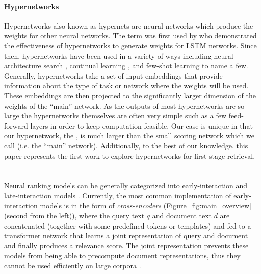 \documentclass[sigconf,]{acmart}
\begin{document}
\paragraph{\textbf{Hypernetworks}}
Hypernetworks also known as hypernets are neural networks which produce the weights for other neural networks. The term was first used by \citet{HyperNetworks} who demonstrated the effectiveness of hypernetworks to generate weights for LSTM networks. Since then, hypernetworks have been used in a variety of ways including neural architecture search \cite{GraphHyperNetworksNeuralArchitectureSearch}, continual learning \cite{ContinualLearningWithHypernetworks}, and few-shot learning \cite{MetaLearningWithLatentEmbeddingOptimization, HyperShot} to name a few. Generally, hypernetworks take a set of input embeddings that provide information about the type of task or network where the weights will be used. These embeddings are then projected to the significantly larger dimension of the weights of the ``main'' network. As the outputs of most hypernetworks are so large the hypernetworks themselves are often very simple such as a few feed-forward layers in order to keep computation feasible. Our case is unique in that our hypernetwork, the \name{}, is much larger than the small scoring network which we call \mininame{} (i.e. the ``main'' network). Additionally, to the best of our knowledge, this paper represents the first work to explore hypernetworks for first stage retrieval.


\section{\name}

Neural ranking models can be generally categorized into early-interaction and late-interaction models \cite{Dehghani2017WeakSupervision, MonoBERT, ColBERT_v1, SimLM,citadel,coil,colberter}. Currently, the most common implementation of early-interaction models is in the form of \textit{cross-encoders} (Figure~\ref{fig:main_overview} (second from the left)), where the query text $q$ and document text $d$ are concatenated (together with some predefined tokens or templates) and fed to a transformer network that learns a joint representation of query and document and finally produces a relevance score. The joint representation prevents these models from being able to precompute document representations, thus they cannot be used efficiently on large corpora \cite{Guo2020,Mitra:2018:NeuralIR}.
\end{document}
